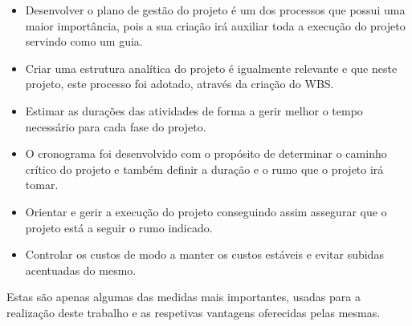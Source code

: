 \begin{itemize}
    \item Desenvolver o plano de gestão do projeto é um dos processos que possui uma maior importância, pois a sua criação irá auxiliar toda a execução do projeto servindo como um guia.
    \item Criar uma estrutura analítica do projeto é igualmente relevante e que neste projeto, este processo foi adotado, através da criação do WBS.
    \item Estimar as durações das atividades de forma a gerir melhor o tempo necessário para cada fase do projeto.
    \item  O cronograma foi desenvolvido com o propósito de determinar o caminho crítico do projeto e também definir a duração e o rumo que o projeto irá tomar. 
    \item Orientar e gerir a execução do projeto conseguindo assim assegurar que o projeto está a seguir o rumo indicado.
    \item Controlar os custos de modo a manter os custos estáveis e evitar subidas acentuadas do mesmo.
\end{itemize}

Estas são apenas algumas das medidas mais importantes, usadas para a realização deste trabalho e as respetivas vantagens oferecidas pelas mesmas.